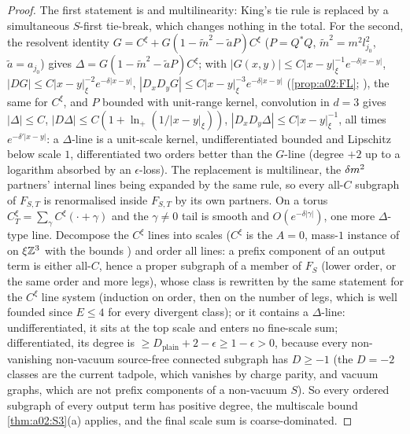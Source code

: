 \begin{proof}
The first statement is \cite[(3.57)--(3.58)]{K1} and multilinearity: King's tie rule is replaced by a simultaneous $S$-first tie-break, which changes nothing in the total. For the second, the resolvent identity $G=C^\xi+G(1-\tilde m^2-\tilde aP)C^\xi$ \cite[p.~437]{Ba3} ($P=Q^*Q$, $\tilde m^2=m^2l_{j_0}^2$, $\tilde a=a_{j_0}$) gives $\Delta=G(1-\tilde m^2-\tilde aP)C^\xi$; with $|G(x,y)|\le C|x-y|_\xi^{-1}e^{-\delta|x-y|}$, $|DG|\le C|x-y|_\xi^{-2}e^{-\delta|x-y|}$, $|D_xD_yG|\le C|x-y|_\xi^{-3}e^{-\delta|x-y|}$ (\cref{prop:a02:FL}; \cite[Thm.~3.3]{K1}), the same for $C^\xi$, and $P$ bounded with unit-range kernel, convolution in $d=3$ gives $|\Delta|\le C$, $|D\Delta|\le C(1+\ln_+(1/|x-y|_\xi))$, $|D_xD_y\Delta|\le C|x-y|_\xi^{-1}$, all times $e^{-\delta'|x-y|}$: a $\Delta$-line is a unit-scale kernel, undifferentiated bounded and Lipschitz below scale $1$, differentiated two orders better than the $G$-line (degree $+2$ up to a logarithm absorbed by an $\epsilon$-loss). The replacement is multilinear, the $\delta m^2$ partners' internal lines being expanded by the same rule, so every all-$C$ subgraph of $F_{S,T}$ is renormalised inside $F_{S,T}$ by its own partners. On a torus $C^\xi_T=\sum_\gamma C^\xi(\cdot+\gamma)$ and the $\gamma\ne0$ tail is smooth and $O(e^{-\delta|\gamma|})$, one more $\Delta$-type line. Decompose the $C^\xi$ lines into scales ($C^\xi$ is the $A=0$, mass-$1$ instance of \cite[(2.13)--(2.17)]{K1} on $\xi\mathbb Z^3$ with the bounds \cite[(3.63)--(3.65)]{K1}) and order all lines: a prefix component of an output term is either all-$C$, hence a proper subgraph of a member of $F_S$ (lower order, or the same order and more legs), whose class is rewritten by the same statement for the $C^\xi$ line system (induction on order, then on the number of legs, which is well founded since $E\le4$ for every divergent class); or it contains a $\Delta$-line: undifferentiated, it sits at the top scale and enters no fine-scale sum; differentiated, its degree is $\ge D_{\mathrm{plain}}+2-\epsilon\ge1-\epsilon>0$, because every non-vanishing non-vacuum source-free connected subgraph has $D\ge-1$ (the $D=-2$ classes are the current tadpole, which vanishes by charge parity, and vacuum graphs, which are not prefix components of a non-vacuum $S$). So every ordered subgraph of every output term has positive degree, the multiscale bound \cref{thm:a02:S3}(a) applies, and the final scale sum is coarse-dominated.
\end{proof}

